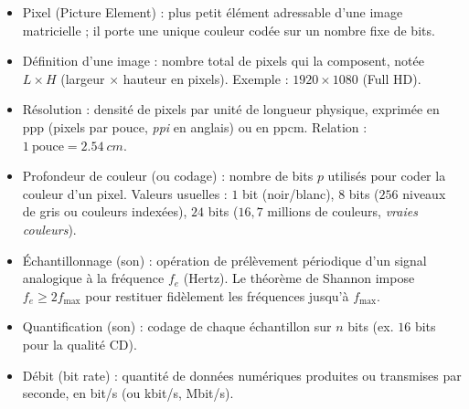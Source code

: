 \documentclass[11pt]{article}
\newcommand{\cle}[1]{{\popxbold\color{popdark}#1}}
\begin{document}
\begin{definition}
\begin{itemize}
  \item \cle{Pixel} (Picture Element) : plus petit élément adressable d'une image matricielle ; il porte une unique couleur codée sur un nombre fixe de bits.
  \item \cle{Définition} d'une image : nombre total de pixels qui la composent, notée $L \times H$ (largeur $\times$ hauteur en pixels). Exemple : $1920 \times 1080$ (Full HD).
  \item \cle{Résolution} : densité de pixels par unité de longueur physique, exprimée en \cle{ppp} (pixels par pouce, \emph{ppi} en anglais) ou en ppcm. Relation : $1~\text{pouce} = \SI{2,54}{cm}$.
  \item \cle{Profondeur de couleur} (ou codage) : nombre de bits $p$ utilisés pour coder la couleur d'un pixel. Valeurs usuelles : $1$ bit (noir/blanc), $8$ bits ($256$ niveaux de gris ou couleurs indexées), $24$ bits ($16,7$ millions de couleurs, \emph{vraies couleurs}).
  \item \cle{Échantillonnage} (son) : opération de prélèvement périodique d'un signal analogique à la fréquence $f_e$ (Hertz). Le théorème de Shannon impose $f_e \ge 2 f_{\max}$ pour restituer fidèlement les fréquences jusqu'à $f_{\max}$.
  \item \cle{Quantification} (son) : codage de chaque échantillon sur $n$ bits (ex. $16$ bits pour la qualité CD).
  \item \cle{Débit} (bit rate) : quantité de données numériques produites ou transmises par seconde, en bit/s (ou kbit/s, Mbit/s).
\end{itemize}
\end{definition}
\end{document}
